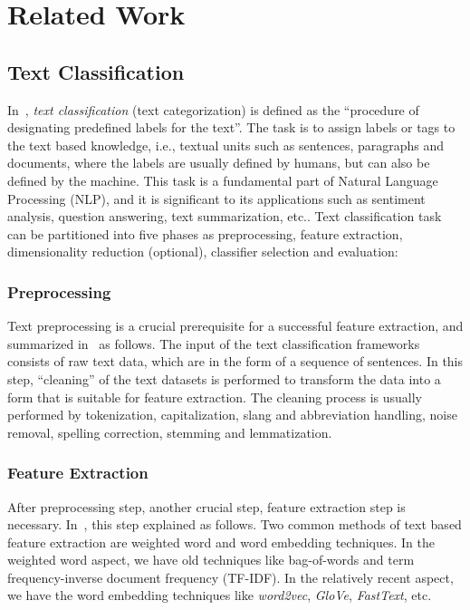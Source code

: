 \section{Related Work}\label{sec:related_work}
\subsection{Text Classification}\label{sec:related:TC}
In~\autocite{li20tc}, \emph{text classification} (text categorization) is defined as the ``procedure of designating predefined labels for the text''. The task is to assign labels or tags to the text based knowledge, i.e., textual units such as sentences, paragraphs and documents, where the labels are usually defined by humans, but can also be defined by the machine. This task is a fundamental part of Natural Language Processing (NLP), and it is significant to its applications such as sentiment analysis, question answering, text summarization, etc.. Text classification task can be partitioned into five phases as preprocessing, feature extraction, dimensionality reduction (optional), classifier selection and evaluation:

\subsubsection{Preprocessing}
Text preprocessing is a crucial prerequisite for a successful feature extraction, and summarized in~\autocite{kowsari19tc} as follows. The input of the text classification frameworks consists of raw text data, which are in the form of a sequence of sentences. In this step, ``cleaning'' of the text datasets is performed to transform the data into a form that is suitable for feature extraction. The cleaning process is usually performed by tokenization, capitalization, slang and abbreviation handling, noise removal, spelling correction, stemming and lemmatization.

\subsubsection{Feature Extraction}
After preprocessing step, another crucial step, feature extraction step is necessary. In~\autocite{kowsari19tc}, this step explained as follows. Two common methods of text based feature extraction are weighted word and word embedding techniques. In the weighted word aspect, we have old techniques like bag-of-words and term frequency-inverse document frequency (TF-IDF). In the relatively recent aspect, we have the word embedding techniques like \emph{word2vec}, \emph{GloVe}, \emph{FastText}, etc.

